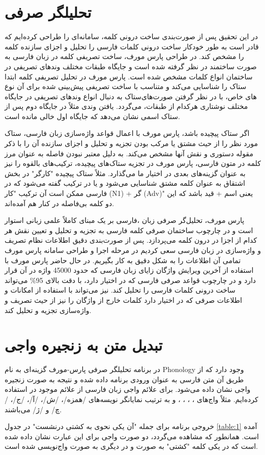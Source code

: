 \documentclass[12pt,onecolumn,a4paper]{article}
\begin{document}
    \section{تحلیلگر صرفی}
    در این تحقیق پس از صورت‌بندی ساخت درونی کلمه، سامانه‌ای را طراحی کرده‌ایم که قادر است به طور خودکار ساخت درونی کلمات فارسی را تحلیل و اجزای سازنده کلمه را مشخص کند. در طراحی پارس مورف، ساخت تصریفی کلمه در زبان فارسی {\mfo\citep{eslami_88}} به صورت ساختمند در نظر گرفته شده است و جایگاه طبقات مختلف وندهای تصریفی در ساختمان انواع کلمات مشخص شده است. پارس مورف در تحلیل تصریفی کلمه ابتدا ستاک را شناسایی می‌کند و متناسب با ساخت تصریفی پیش‌بینی شده برای آن نوع ستاک به دنبال انواع وندهای تصریفی در جایگاه‎‌های خاص، با در نظر گرفتن صورت‌های مختلف نوشتاری هرکدام از طبقات، می‌گردد. یافتن وندی مثلاً در جایگاه دوم پس از ستاک اسمی نشان می‌دهد که جایگاه اول خالی مانده است.
    \par
    اگر ستاک پیچیده باشد، پارس مورف با اعمال قواعد واژه‌سازی زبان فارسی، ستاک مورد نظر را از حیث مشتق یا مرکب بودن تجزیه و تحلیل و اجزای سازنده آن را با ذکر مقوله دستوری و نقش آنها مشخص می‌کند. به دلیل معتبر نبودن فاصله به عنوان مرز کلمه در متون فارسی، پارس مورف در تجزیه ستاک‌های پیچیده، ترکیب‌های بالقوه را نیز به عنوان گزینه‌های بعدی در اختیار ما می‌گذارد. مثلاً ستاک پیچیده "کارگر" در بخش اشتقاق به عنوان کلمه مشتق شناسایی می‌شود و یا در ترکیب گفته می‌شود که در فارسی ممکن است آن ترکیب "کار (N1) + گر (Adv)" یعنی اسم + قید باشد که این دو کلمه بی‌فاصله در کنار هم آمده‌اند.
    \par
    پارس مورف، تحلیل‌گر صرفی زبان ،فارسی بر یک مبنای کاملاً علمی زبانی استوار است و در چارچوب ساختمان صرفی کلمه فارسی به تجزیه و تحلیل و تعیین نقش هر کدام از اجزا در درون کلمه می‌پردازد. پس از صورت‌بندی دقیق اطلاعات نظام تصریف و واژه‌سازی در زبان فارسی سعی کردیم در مرحله اجرا و طراحی سامانه پارس مورف تمامی آن اطلاعات را به شکل دقیق به کار بگیریم. در حال حاضر پارس مورف با استفاده از آخرین ویرایش واژگان زایای زبان فارسی {\mfo\citep{eslami_83b}} که حدود 45000 واژه در آن قرار دارد و در چارچوب قواعد صرفی فارسی که در اختیار دارد، با دقت بالای 95\% می‌تواند ساخت درونی کلمات فارسی را تحلیل کند. نیز می‌تواند با استفاده از امکانات و اطلاعات صرفی که در اختیار دارد کلمات خارج از واژگان را نیز از حیث تصریف و واژه‌سازی تجزیه و تحلیل کند.

    \section{تبدیل متن به زنجیره واجی}
    در برنامه تحلیلگر صرفی پارس-مورف گزینه‌ای به نام Phonology وجود دارد که از طریق آن متن فارسی به عنوان ورودی برنامه داده شده و نتیجه به صورت زنجیره واجی نشان داده می‌شود. برای علائم واجی زبان فارسی از علائم موجود در {\mfo\citep{samareh_78}} استفاده کرده‌ایم. مثلاً واج‌های  ، ، ،  ،  و  به ترتیب نمایانگر نویسه‌های /همزه/، /ش/، /آ/، /ج/، /چ/ و /ژ/ می‌باشند.
    \par
    خروجی برنامه برای جمله "آن یکی نحوی به کشتی درنشست" در جدول \ref{table:1} آمده است. همانطور که مشاهده می‌گردد، دو صورت واجی برای این عبارت نشان داده شده است که در یکی کلمه "کشتی" به صورت  و در دیگری به صورت  واج‌نویسی شده است.
\end{document}
